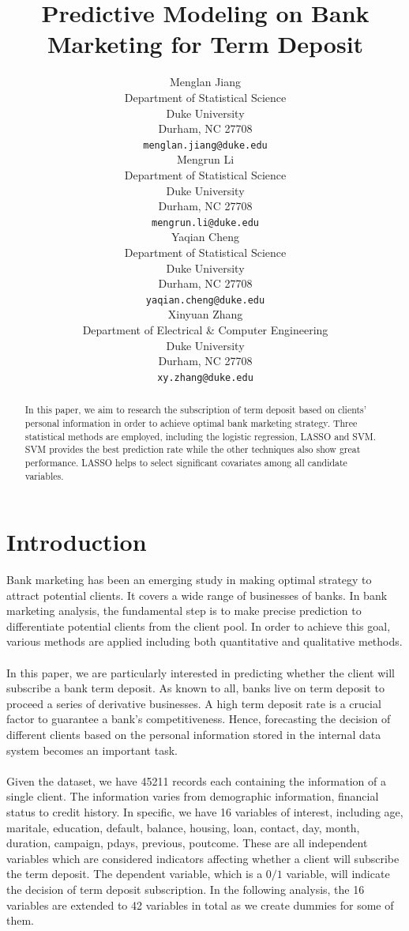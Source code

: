 \documentclass{article} %
\title{Predictive Modeling on Bank Marketing for Term Deposit}
\author{
  Menglan Jiang \\
  Department of Statistical Science\\
  Duke University\\
  Durham, NC 27708 \\
  \texttt{menglan.jiang@duke.edu} \\
  \And
  Mengrun Li \\
  Department of Statistical Science\\
  Duke University\\
  Durham, NC 27708 \\
  \texttt{mengrun.li@duke.edu} \\
  \AND
  Yaqian Cheng \\
  Department of Statistical Science\\
  Duke University\\
  Durham, NC 27708 \\
  \texttt{yaqian.cheng@duke.edu} \\
  \And
  Xinyuan Zhang \\
  Department of Electrical \& Computer Engineering\\
  Duke University\\
  Durham, NC 27708 \\
  \texttt{xy.zhang@duke.edu} \\
}
\begin{document}
\maketitle

\begin{abstract}
In this paper, we aim to research the subscription of term deposit based on clients' personal information in order to achieve optimal bank marketing strategy. Three statistical methods are employed, including the logistic regression, LASSO and SVM. SVM provides the best prediction rate while the other techniques also show great performance. LASSO helps to select significant covariates among all candidate variables.
\end{abstract}

\section{Introduction}
\label{introduction}
Bank marketing has been an emerging study in making optimal strategy to attract potential clients. It covers a wide range of businesses of banks. In bank marketing analysis, the fundamental step is to make precise prediction to differentiate potential clients from the client pool. In order to achieve this goal, various methods are applied including both quantitative and qualitative methods. \\\\
In this paper, we are particularly interested in predicting whether the client will subscribe a bank term deposit. As known to all, banks live on term deposit to proceed a series of derivative businesses. A high term deposit rate is a crucial factor to guarantee a bank's competitiveness. Hence, forecasting the decision of different clients based on the personal information stored in the internal data system becomes an important task. \\\\
Given the dataset, we have 45211 records each containing the information of a single client. The information varies from demographic information, financial status to credit history. In specific, we have 16 variables of interest, including age, maritale, education, default, balance, housing, loan, contact, day, month, duration, campaign, pdays, previous, poutcome. These are all independent variables which are considered indicators affecting whether a client will subscribe the term deposit. The dependent variable, which is a $0/1$ variable, will indicate the decision of term deposit subscription. In the following analysis, the 16 variables are extended to 42 variables in total as we create dummies for some of them.\\\\
\end{document}
